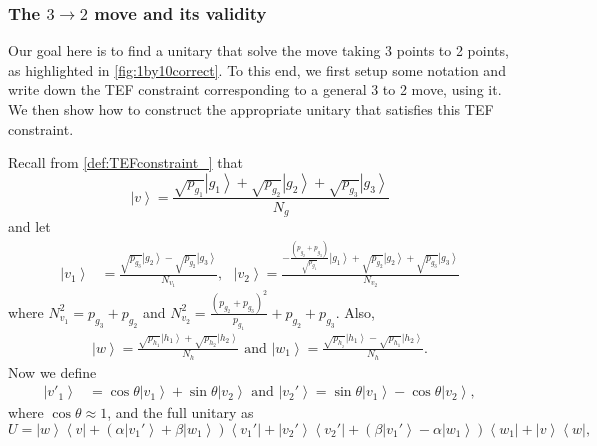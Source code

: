 \documentclass{article}
\newcommand{\atul}[1]{#1} %
\begin{document}
\subsubsection{The \texorpdfstring{$3\to2$}{3 -> 2} move and its validity}\label{subsubsec:3to2}
\atul{Our goal here is to find a unitary that solve the move taking 3 points to 2 points, as highlighted in  \cref{fig:1by10correct}. To this end, we first setup some notation and write down the TEF constraint corresponding to a general 3 to 2 move, using it. We then show how to construct the appropriate unitary that satisfies this TEF constraint.} %


Recall \atul{from \cref{def:TEFconstraint_}} that
\begin{displaymath}
  \left|v\right\rangle =\frac{\sqrt{p_{g_{1}}}\left|g_{1}\right\rangle +\sqrt{p_{g_{2}}}\left|g_{2}\right\rangle +\sqrt{p_{g_{3}}}\left|g_{3}\right\rangle }{N_{g}}
\end{displaymath}
and let
\begin{align*}
  \left|v_{1}\right\rangle & =\frac{\sqrt{p_{g_{3}}}\left|g_{2}\right\rangle -\sqrt{p_{g_{2}}}\left|g_{3}\right\rangle }{N_{v_{1}}},\ \ \
  \left|v_{2}\right\rangle   =\frac{-\frac{(p_{g_{2}}+p_{g_{3}})}{\sqrt{p_{g_{1}}}}\left|g_{1}\right\rangle +\sqrt{p_{g_{2}}}\left|g_{2}\right\rangle +\sqrt{p_{g_{3}}}\left|g_{3}\right\rangle }{N_{v_{2}}}
\end{align*}
where $N_{v_{1}}^{2}=p_{g_{3}}+p_{g_{2}}$ and $N_{v_{2}}^{2}=\frac{(p_{g_{2}}+p_{g_{3}})^{2}}{p_{g_{1}}}+p_{g_{2}}+p_{g_{3}}$.
Also,
\begin{align*}
  \left|w\right\rangle  =\frac{\sqrt{p_{h_{1}}}\left|h_{1}\right\rangle +\sqrt{p_{h_{2}}}\left|h_{2}\right\rangle }{N_{h}} \text{ and }
  \left|w_{1}\right\rangle   =\frac{\sqrt{p_{h_{_{2}}}}\left|h_{1}\right\rangle -\sqrt{p_{h_{1}}}\left|h_{2}\right\rangle }{N_{h}}.
\end{align*}
Now we define
\begin{align*}
  \left|v'_{1}\right\rangle & =\cos\theta\left|v_{1}\right\rangle +\sin\theta\left|v_{2}\right\rangle \text{ and }
  \left|v_{2}'\right\rangle   =\sin\theta\left|v_{1}\right\rangle -\cos\theta\left|v_{2}\right\rangle,
\end{align*}
where $\cos\theta\approx 1$, and the full unitary as
\begin{displaymath}
  U=\left|w\right\rangle \left\langle v\right|+\left(\alpha\left|v_{1}'\right\rangle +\beta\left|w_{1}\right\rangle \right)\left\langle v_{1}'\right|+\left|v_{2}'\right\rangle \left\langle v_{2}'\right|+\left(\beta\left|v_{1}'\right\rangle -\alpha\left|w_{1}\right\rangle \right)\left\langle w_{1}\right|+\left|v\right\rangle \left\langle w\right|,
\end{displaymath}
\end{document}
